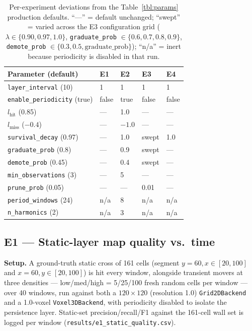 \documentclass[conference]{IEEEtran}
\begin{document}
\begin{table}[t]
\centering
\caption{Per-experiment deviations from the Table~\ref{tbl:params} production defaults. ``---'' = default unchanged; ``swept'' = varied across the E3 configuration grid ($\lambda\in\{0.90,0.97,1.0\}$, \texttt{graduate\_prob} $\in\{0.6,0.7,0.8,0.9\}$, \texttt{demote\_prob} $\in\{0.3,0.5,\text{graduate\_prob}\}$); ``n/a'' = inert because periodicity is disabled in that run.}
\label{tbl:eparams}
\small
\begin{tabular}{@{}lllll@{}}
\toprule
Parameter (default) & E1 & E2 & E3 & E4 \\
\midrule
\texttt{layer\_interval} (10) & 1 & 1 & 1 & 1 \\
\texttt{enable\_periodicity} (true) & false & true & false & false \\
$l_{\text{hit}}$ (0.85) & --- & 1.0 & --- & --- \\
$l_{\text{miss}}$ ($-0.4$) & --- & $-1.0$ & --- & --- \\
\texttt{survival\_decay} (0.97) & --- & 1.0 & swept & 1.0 \\
\texttt{graduate\_prob} (0.8) & --- & 0.9 & swept & --- \\
\texttt{demote\_prob} (0.45) & --- & 0.4 & swept & --- \\
\texttt{min\_observations} (3) & --- & 5 & --- & --- \\
\texttt{prune\_prob} (0.05) & --- & --- & 0.01 & --- \\
\texttt{period\_windows} (24) & n/a & 8 & n/a & n/a \\
\texttt{n\_harmonics} (2) & n/a & 3 & n/a & n/a \\
\bottomrule
\end{tabular}
\end{table}

\subsection{E1 --- Static-layer map quality vs.\ time}

\textbf{Setup.} A ground-truth static cross of 161 cells (segment $y{=}60,
x\in[20,100]$ and $x{=}60, y\in[20,100]$) is hit every window, alongside
transient movers at three densities --- low/med/high = 5/25/100 fresh random
cells per window --- over 40 windows, run against both a $120\times120$
(resolution 1.0) \texttt{Grid2DBackend} and a 1.0-voxel \texttt{Voxel3DBackend}, with
periodicity disabled to isolate the persistence layer. Static-set
precision/recall/F1 against the 161-cell wall set is logged per window
(\texttt{results/e1\_static\_quality.csv}).
\end{document}
